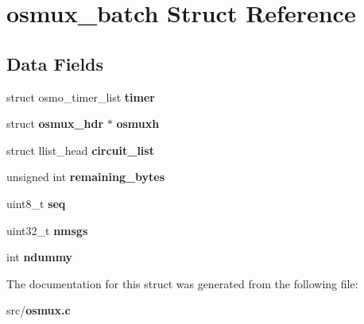 \section{osmux\+\_\+batch Struct Reference}
\label{structosmux__batch}
\subsection*{Data Fields}
\begin{DoxyCompactItemize}
\item 
struct osmo\+\_\+timer\+\_\+list {\bfseries timer}\label{structosmux__batch_aeb47541753d01cd0614b8d192ac9f8a7}

\item 
struct {\bf osmux\+\_\+hdr} $\ast$ {\bfseries osmuxh}\label{structosmux__batch_a6eba2a9e5109b28a26d4a73818573cb5}

\item 
struct llist\+\_\+head {\bfseries circuit\+\_\+list}\label{structosmux__batch_a842f0efe1b94f291d749dcb7f8b4ecac}

\item 
unsigned int {\bfseries remaining\+\_\+bytes}\label{structosmux__batch_a234077c85b52c7ac83f62df353edda30}

\item 
uint8\+\_\+t {\bfseries seq}\label{structosmux__batch_a167c6659b6740ad9fd2e47c4fe520d5b}

\item 
uint32\+\_\+t {\bfseries nmsgs}\label{structosmux__batch_a3ea13cf1fa7e69a14c240456de2ab0b8}

\item 
int {\bfseries ndummy}\label{structosmux__batch_ad30c9a1c9f859a35277f8159fd899d46}

\end{DoxyCompactItemize}


The documentation for this struct was generated from the following file\+:\begin{DoxyCompactItemize}
\item 
src/{\bf osmux.\+c}\end{DoxyCompactItemize}
